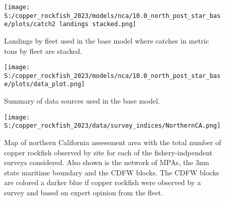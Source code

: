 \documentclass[11pt,
  letterpaper,
]{article}
\begin{document}
\pagebreak

\begin{figure}
{\centering
\texttt{[image: S:/copper\_rockfish\_2023/models/nca/10.0\_north\_post\_star\_base/plots/catch2 landings stacked.png]}
}
\caption{Landings by fleet used in the base model where catches in metric tons by fleet are stacked.\label{fig:catch}}
\end{figure}

\pagebreak

\begin{figure}
{\centering
\texttt{[image: S:/copper\_rockfish\_2023/models/nca/10.0\_north\_post\_star\_base/plots/data\_plot.png]}
}
\caption{Summary of data sources used in the base model.\label{fig:data-plot}}
\end{figure}

\begin{figure}
{\centering
\texttt{[image: S:/copper\_rockfish\_2023/data/survey\_indices/NorthernCA.png]}
}
\caption{Map of northern California assessment area with the total number of copper rockfish observed by site for each of the fishery-indpendent surveys considered. Also shown is the network of MPAs, the 3nm state maritime boundary and the CDFW blocks. The CDFW blocks are colored a darker blue if copper rockfish were observed by a survey and based on expert opinion from the fleet.\label{fig:survey-map}}
\end{figure}
\end{document}
